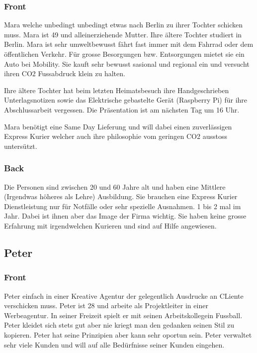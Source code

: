 \subsubsection{Front}
Mara welche unbedingt unbedingt etwas nach Berlin zu ihrer Tochter schicken muss.
Mara ist 49 und alleinerziehende Mutter. Ihre ältere Tochter studiert in Berlin. Mara ist sehr umweltbewusst fährt fast immer mit dem Fahrrad oder dem öffentlichen Verkehr. Für grosse Besorgungen bzw. Entsorgungen mietet sie ein Auto bei Mobility. Sie kauft sehr bewusst sasional und regional ein und versucht ihren CO2 Fussabdruck klein zu halten.

Ihre ältere Tochter hat beim letzten Heimatsbesuch ihre Handgeschrieben Unterlagsnotizen sowie das Elektrische gebastelte Gerät (Raspberry Pi) für ihre Abschlussarbeit vergessen. Die Präsentation ist am nächsten Tag um 16 Uhr.

Mara benötigt eine Same Day Lieferung und will dabei einen zuverlässigen Express Kurier welcher auch ihre philosophie vom geringen CO2 ausstoss untersützt.

\subsubsection{Back}
Die Personen sind zwischen 20 und 60 Jahre alt und haben eine Mittlere (Irgendwas höheres als Lehre) Ausbildung. Sie brauchen eine Express Kurier Dienstleistung nur für Notfälle oder sehr spezielle Ausnahmen. 1 bis 2 mal im Jahr. Dabei ist ihnen aber das Image der Firma wichtig. Sie haben keine grosse Erfahrung mit irgendwelchen Kurieren und sind auf Hilfe angewiesen.



\subsection{Peter}
\subsubsection{Front}
Peter einfach in einer Kreative Agentur der gelegentlich Ausdrucke an CLiente verschicken muss.
Peter ist 28 und arbeite als Projektleiter in einer Werbeagentur. In seiner Freizeit spielt er mit seinen Arbeitskollegein Fussball. Peter kleidet sich stets gut aber nie kriegt man den gedanken seinen Stil zu kopieren. Peter hat seine Prinzipien aber kann sehr oportun sein. Peter verwaltet sehr viele Kunden und will auf alle Bedürfnisse seiner Kunden eingehen.

